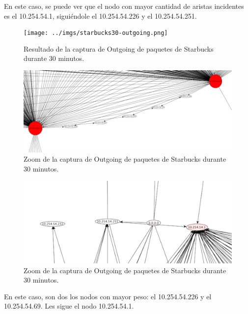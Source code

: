 \documentclass[10pt, a4paper]{article}
\begin{document}
En este caso, se puede ver que el nodo con mayor cantidad de aristas incidentes es el 10.254.54.1, siguiéndole el 10.254.54.226 y el 10.254.54.251.

\begin{figure}[H] %
\begin{center}
\texttt{[image: ../imgs/starbucks30-outgoing.png]}
\caption{Resultado de la captura de Outgoing de paquetes de Starbucks durante 30 minutos.}
\end{center}
\end{figure}

\begin{figure}[H] %
\begin{center}
\includegraphics[width=450pt]{../imgs/zoom-starbucks-outgoing.png}
\caption{Zoom de la captura de Outgoing de paquetes de Starbucks durante 30 minutos.}
\end{center}
\end{figure}

\begin{figure}[H] %
\begin{center}
\includegraphics[width=450pt]{../imgs/zoom-starbucks-outgoing2.png}
\caption{Zoom de la captura de Outgoing de paquetes de Starbucks durante 30 minutos.}
\end{center}
\end{figure}

En este caso, son dos los nodos con mayor peso: el 10.254.54.226 y el 10.254.54.69. Les sigue el nodo 10.254.54.1.
\end{document}
